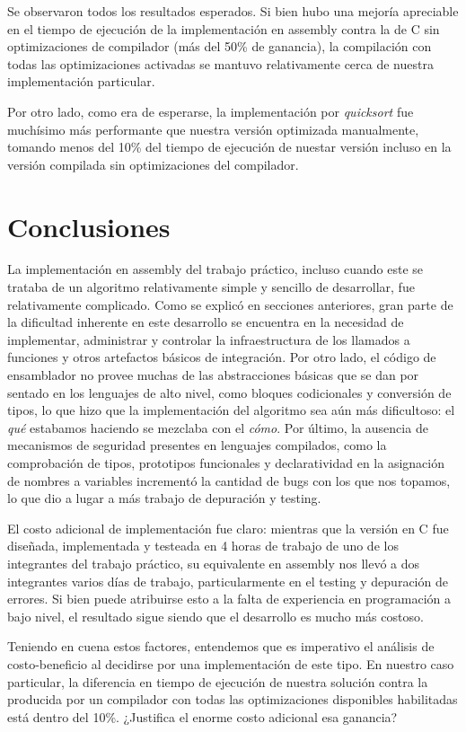 \documentclass[a4paper,11pt]{article}
\begin{document}
Se observaron todos los resultados esperados. Si bien hubo una mejoría
apreciable en el tiempo de ejecución de la implementación en assembly contra la
de C sin optimizaciones de compilador (más del 50\% de ganancia), la
compilación con todas las optimizaciones activadas se mantuvo relativamente
cerca de nuestra implementación particular.

Por otro lado, como era de esperarse, la implementación por \textit{quicksort}
fue muchísimo más performante que nuestra versión optimizada manualmente,
tomando menos del 10\% del tiempo de ejecución de nuestar versión incluso en la
versión compilada sin optimizaciones del compilador.

\section{Conclusiones}

La implementación en assembly del trabajo práctico, incluso cuando este se
trataba de un algoritmo relativamente simple y sencillo de desarrollar, fue
relativamente complicado. Como se explicó en secciones anteriores, gran parte
de la dificultad inherente en este desarrollo se encuentra en la necesidad de
implementar, administrar y controlar la infraestructura de los llamados a
funciones y otros artefactos básicos de integración. Por otro lado, el código
de ensamblador no provee muchas de las abstracciones básicas que se dan por
sentado en los lenguajes de alto nivel, como bloques codicionales y conversión
de tipos, lo que hizo que la implementación del algoritmo sea aún más
dificultoso: el \textit{qué} estabamos haciendo se mezclaba con el
\textit{cómo}. Por último, la ausencia de mecanismos de seguridad presentes en
lenguajes compilados, como la comprobación de tipos, prototipos funcionales y
declaratividad en la asignación de nombres a variables incrementó la cantidad
de bugs con los que nos topamos, lo que dio a lugar a más trabajo de depuración
y testing.

El costo adicional de implementación fue claro: mientras que la versión en C
fue diseñada, implementada y testeada en 4 horas de trabajo de uno de los
integrantes del trabajo práctico, su equivalente en assembly nos llevó a dos
integrantes varios días de trabajo, particularmente en el testing y depuración
de errores. Si bien puede atribuirse esto a la falta de experiencia en
programación a bajo nivel, el resultado sigue siendo que el desarrollo es mucho
más costoso.

Teniendo en cuena estos factores, entendemos que es imperativo el análisis de
costo-beneficio al decidirse por una implementación de este tipo. En nuestro
caso particular, la diferencia en tiempo de ejecución de nuestra solución
contra la producida por un compilador con todas las optimizaciones disponibles
habilitadas está dentro del 10\%. ¿Justifica el enorme costo adicional esa
ganancia?
\end{document}
